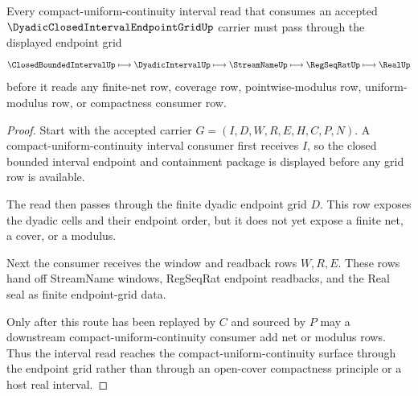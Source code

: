 \begin{theorem}
\label{thm:dyadic-closed-interval-endpoint-grid-window-handoff}
Every compact-uniform-continuity interval read that consumes an accepted $\DyadicClosedIntervalEndpointGridUp$ carrier must pass through the displayed endpoint grid
$$
\ClosedBoundedIntervalUp \longmapsto \DyadicIntervalUp \longmapsto \StreamNameUp \longmapsto \RegSeqRatUp \longmapsto \RealUp
$$
before it reads any finite-net row, coverage row, pointwise-modulus row, uniform-modulus row, or compactness consumer row.
\end{theorem}
\begin{proof}
Start with the accepted carrier $G=(I,D,W,R,E,H,C,P,N)$. A compact-uniform-continuity interval consumer first receives $I$, so the closed bounded interval endpoint and containment package is displayed before any grid row is available.

The read then passes through the finite dyadic endpoint grid $D$. This row exposes the dyadic cells and their endpoint order, but it does not yet expose a finite net, a cover, or a modulus.

Next the consumer receives the window and readback rows $W,R,E$. These rows hand off StreamName windows, RegSeqRat endpoint readbacks, and the Real seal as finite endpoint-grid data.

Only after this route has been replayed by $C$ and sourced by $P$ may a downstream compact-uniform-continuity consumer add net or modulus rows. Thus the interval read reaches the compact-uniform-continuity surface through the endpoint grid rather than through an open-cover compactness principle or a host real interval.
\end{proof}



